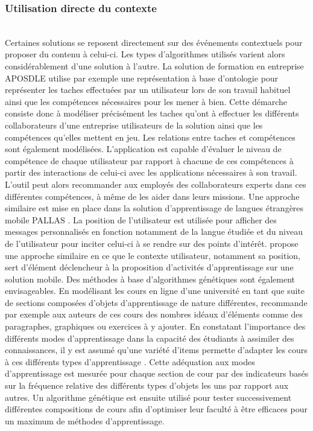 \documentclass[conference]{./sty/IEEEtran}
\begin{document}
\subsubsection{Utilisation directe du contexte}
~\\Certaines solutions se reposent directement sur des événements contextuels  pour proposer du contenu à celui-ci. Les types d'algorithmes utilisés varient alors considérablement d'une solution à l'autre. La solution de formation en entreprise APOSDLE utilise par exemple une représentation à base d'ontologie pour représenter les taches effectuées par un utilisateur lors de son travail habituel ainsi que les compétences nécessaires pour les mener à bien\cite{DBLP:journals/procedia/BehamKLL10}. Cette démarche consiste donc à modéliser précisément les taches qu'ont à effectuer les différents collaborateurs d'une entreprise utilisateurs de la solution ainsi que les compétences qu'elles mettent en jeu. Les relations entre taches et compétences sont également modélisées. L'application est capable d'évaluer le niveau de compétence de chaque utilisateur par rapport à chacune de ces compétences à partir des interactions de celui-ci avec les applications nécessaires à son travail. L'outil peut alors recommander aux employés des collaborateurs experts dans ces différentes compétences, à même de les aider dans leurs missions. Une approche similaire est mise en place dans la solution d'apprentissage de langues étrangères mobile PALLAS \cite{DBLP:conf/wmte/PetersenM06}. La position de l'utilisateur est utilisée pour afficher des messages personnalisés en fonction notamment de la langue étudiée et du niveau de l'utilisateur pour inciter celui-ci à se rendre sur des points d'intérêt. \cite{Kurti:2008:CMS:1456223.1456331} propose une approche similaire en ce que le contexte utilisateur, notamment sa position, sert d'élément déclencheur à la proposition d'activités d'apprentissage sur une solution mobile. Des méthodes à base d'algorithmes génétiques sont également envisageables. En modélisant les cours en ligne d'une université en tant que suite de sections composées d'objets d'apprentissage de nature différentes, \cite{smartECourseRecommander} recommande par exemple aux auteurs de ces cours des nombres idéaux d'éléments comme des paragraphes, graphiques ou exercices à y ajouter. En constatant l'importance des différents modes d'apprentissage dans la capacité des étudiants à assimiler des connaissances, il y est assumé qu'une variété d'items permette d'adapter les cours à ces différents types d'apprentissage . Cette adéquation aux modes d'apprentissage est mesurée pour chaque section de cour par des indicateurs basés sur la fréquence relative des différents types d'objets les uns par rapport aux autres. Un algorithme génétique est ensuite utilisé pour tester successivement différentes compositions de cours afin d'optimiser leur faculté à être efficaces pour un maximum de méthodes d'apprentissage. 
\end{document}
